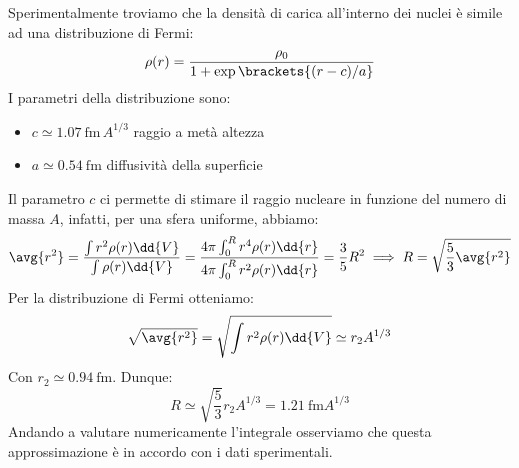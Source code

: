Sperimentalmente troviamo che la densità di carica all'interno dei nuclei è simile ad una distribuzione di Fermi:
\begin{equation}
 \rho(r) = \dfrac{\rho_0}{1 + \exp\brackets{(r-c)/a}}
\end{equation}
I parametri della distribuzione sono:
\begin{itemize}
 \item $c \simeq \qty{1.07}{\femto\meter}\,A^{1/3}$ raggio a metà altezza
 \item $a \simeq \qty{0.54}{\femto\meter}$ diffusività della superficie
\end{itemize}
Il parametro $c$ ci permette di stimare il raggio nucleare in funzione del numero di massa $A$, infatti, per una sfera uniforme, abbiamo:
\begin{equation}
    \avg{r^2} = \dfrac{\int r^2 \rho(r) \dd{V}}{\int \rho(r) \dd{V}} = \dfrac{4 \pi \int_0^{R} r^4 \rho(r) \dd{r}}{4 \pi \int_0^{R} r^2 \rho(r) \dd{r}} = \dfrac{3}{5} R^2 \implies R = \sqrt{\dfrac{5}{3}\avg{r^2}}
\end{equation}
Per la distribuzione di Fermi otteniamo:
\begin{equation}
 \sqrt{\avg{r^2}} = \sqrt{\int r^2 \rho(r) \dd{V}} \simeq r_2 A^{1/3}
\end{equation}
Con $r_2 \simeq \qty{0.94}{\femto\meter}$. Dunque:
\begin{equation}
 R \simeq \sqrt{\dfrac{5}{3}}r_2A^{1/3} = \qty{1.21}{\femto\meter} A^{1/3}
\end{equation}
Andando a valutare numericamente l'integrale osserviamo che questa approssimazione è in accordo con i dati sperimentali.


